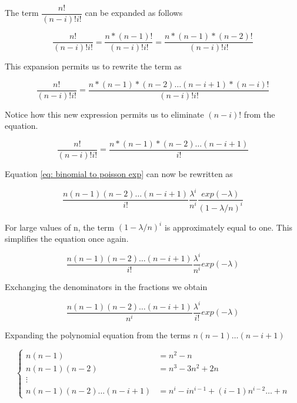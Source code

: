 \documentclass[a4paper,12pt]{article}
\begin{document}
 The term $ \dfrac{n!}{(n-i)!  i!}$ can be expanded as follows

 \begin{equation*}
   \dfrac{n!}{(n-i)!  i!} =  \dfrac{n * (n-1)!}{(n-i)!  i!}
   =  \dfrac{n*(n-1)*(n-2)!}{(n-i)!  i!}
 \end{equation*}

 This expansion permits us to rewrite the term as

 \begin{equation*}
  \dfrac{n!}{(n-i)!  i!} =  \dfrac{n*(n-1)* (n-2) \dots (n-i+1)* (n-i)!}{(n-i)!  i!}
 \end{equation*}

 Notice how this new expression permits us to eliminate  $(n-i)!$ from the equation.

 \begin{equation*}
  \dfrac{n!}{(n-i)!  i!} = \dfrac{n*(n-1)* (n-2) \dots (n-i+1)}{i!}
 \end{equation*}

 Equation \eqref{eq: binomial to poisson exp} can now be rewritten as

 \begin{equation}
   \dfrac{n(n-1) (n-2) \dots (n-i+1)}{i!} \dfrac{\lambda ^i}{n ^i} \dfrac{exp(-\lambda)}{(1 - \lambda / n  )^i}
 \end{equation}


 For large values of n, the term $(1 - \lambda / n  )^i$ is approximately equal to one.
 This simplifies the equation once again.

 \begin{equation}
   \dfrac{n(n-1) (n-2) \dots (n-i+1)}{i!} \dfrac{\lambda ^i}{n ^i} exp(-\lambda)
 \end{equation}

 Exchanging the denominators in the fractions we obtain

 \begin{equation}
   \dfrac{n(n-1) (n-2) \dots (n-i+1)}{n^i} \dfrac{\lambda ^i}{i!} exp(-\lambda)
   \label{eq: binomial to poisson denominators}
 \end{equation}

 Expanding the polynomial equation from the terms $n(n-1)\dots (n-i+1)$

 \begin{equation*}
  \begin{cases}
   n (n-1) &= n^2 -n \\
   n (n-1) (n-2) &= n^3 -3 n^2 + 2n \\
   \vdots & \\
   n (n-1) (n-2) \dots (n-i+1) &= n^i - i n^{i-1} + (i-1)n^{i-2} \dots +  n
  \end{cases}
 \end{equation*}
\end{document}
